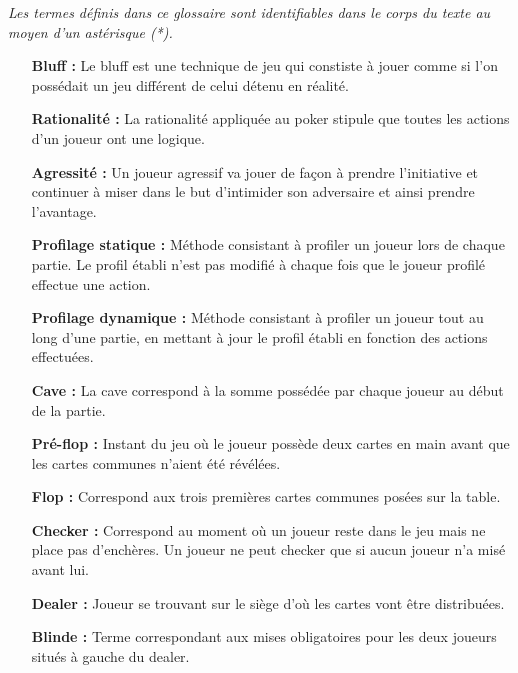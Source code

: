 \documentclass{report}
\begin{document}
	\textit{Les termes définis dans ce glossaire sont identifiables dans le corps du texte au moyen d'un astérisque (*).}
	\bigbreak
	\begin{itemize}
	
		\item[\textbf{Bluff : }]Le bluff est une technique de jeu qui constiste à jouer comme si l'on possédait un jeu différent de celui détenu en réalité.\medskip
		
		\item[\textbf{Rationalité : }]La rationalité  appliquée au poker stipule que toutes les actions d'un joueur ont une logique.\medskip

		\item[\textbf{Agressité : }]	Un joueur agressif va jouer de façon à prendre l'initiative et continuer à miser dans le but d'intimider son adversaire et ainsi prendre l'avantage.	\medskip
		
		\item[\textbf{Profilage statique : }]Méthode consistant à profiler un joueur lors de chaque partie. Le profil établi n'est pas modifié à chaque fois que le joueur profilé effectue une action.\medskip
		
		\item[\textbf{Profilage dynamique : }]Méthode consistant à profiler un joueur tout au long d'une partie, en mettant à jour le profil établi en fonction des actions effectuées.\medskip
		
		\item[\textbf{Cave : }]La cave correspond à la somme possédée par chaque joueur au début de la partie.\medskip
		
		\item[\textbf{Pré-flop : }]Instant du jeu où le joueur possède deux cartes en main avant que les cartes communes n'aient été révélées.\medskip
		
		\item[\textbf{Flop : }]Correspond aux trois premières cartes communes posées sur la table.\medskip
		
		\item[\textbf{Checker : }]Correspond au moment où un joueur reste dans le jeu mais ne place pas d'enchères. Un joueur ne peut checker que si aucun joueur n'a misé avant lui.\medskip
		
		\item[\textbf{Dealer : }]Joueur se trouvant sur le siège d'où les cartes vont être distribuées.\medskip
		
		\item[\textbf{Blinde : }]Terme correspondant aux mises obligatoires pour les deux joueurs situés à gauche du dealer.\medskip
		

\end{itemize}
\end{document}
